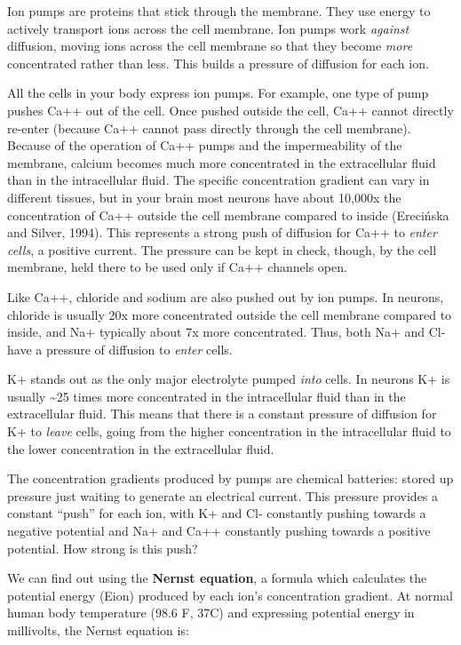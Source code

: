 \documentclass[
]{book}
\begin{document}
Ion pumps are proteins that stick through the membrane. They use energy to actively transport ions across the cell membrane. Ion pumps work \emph{against} diffusion, moving ions across the cell membrane so that they become \emph{more} concentrated rather than less. This builds a pressure of diffusion for each ion.

All the cells in your body express ion pumps. For example, one type of pump pushes Ca++ out of the cell. Once pushed outside the cell, Ca++ cannot directly re-enter (because Ca++ cannot pass directly through the cell membrane). Because of the operation of Ca++ pumps and the impermeability of the membrane, calcium becomes much more concentrated in the extracellular fluid than in the intracellular fluid. The specific concentration gradient can vary in different tissues, but in your brain most neurons have about 10,000x the concentration of Ca++ outside the cell membrane compared to inside (Erecińska and Silver, 1994). This represents a strong push of diffusion for Ca++ to \emph{enter cells}, a positive current. The pressure can be kept in check, though, by the cell membrane, held there to be used only if Ca++ channels open.

Like Ca++, chloride and sodium are also pushed out by ion pumps. In neurons, chloride is usually 20x more concentrated outside the cell membrane compared to inside, and Na+ typically about 7x more concentrated. Thus, both Na+ and Cl- have a pressure of diffusion to \emph{enter} cells.

K+ stands out as the only major electrolyte pumped \emph{into} cells. In neurons K+ is usually \textasciitilde25 times more concentrated in the intracellular fluid than in the extracellular fluid. This means that there is a constant pressure of diffusion for K+ to \emph{leave} cells, going from the higher concentration in the intracellular fluid to the lower concentration in the extracellular fluid.

The concentration gradients produced by pumps are chemical batteries: stored up pressure just waiting to generate an electrical current. This pressure provides a constant ``push'' for each ion, with K+ and Cl- constantly pushing towards a negative potential and Na+ and Ca++ constantly pushing towards a positive potential. How strong is this push?

We can find out using the \textbf{Nernst equation}, a formula which calculates the potential energy (Eion) produced by each ion's concentration gradient. At normal human body temperature (98.6 F, 37C) and expressing potential energy in millivolts, the Nernst equation is:
\end{document}
